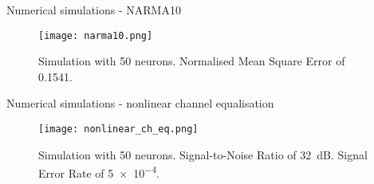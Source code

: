 \begin{frame}{Numerical simulations - NARMA10}
	\begin{figure}
		\centering
		\texttt{[image: narma10.png]}
		\caption{Simulation with 50 neurons. Normalised Mean Square Error of 0.1541.}
	\end{figure}
\end{frame}

\begin{frame}{Numerical simulations - nonlinear channel equalisation}
	\begin{figure}
		\centering
		\texttt{[image: nonlinear\_ch\_eq.png]}
		\caption{Simulation with 50 neurons. Signal-to-Noise Ratio of \SI{32}{\dB}. Signal Error Rate of \num{5e-4}.}
	\end{figure}
\end{frame}